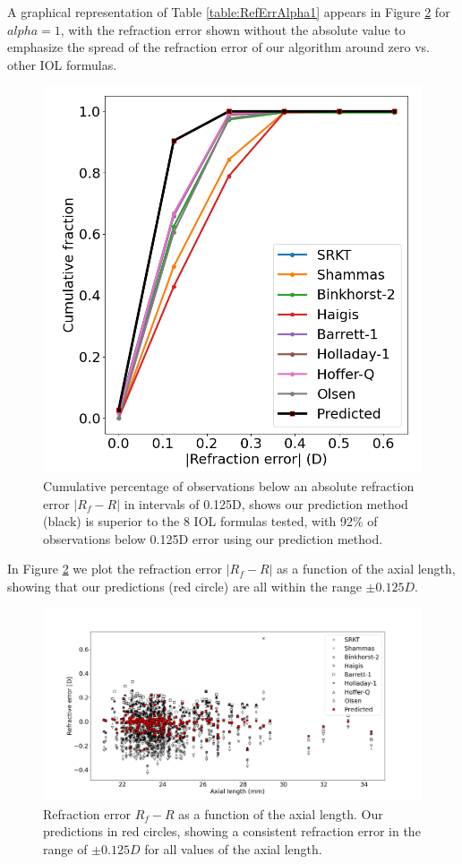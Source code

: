 \documentclass[article,twocolumn,preprint,10pt]{paper}%
\renewcommand{\(}{\left(}
\renewcommand{\)}{\right)}
\renewcommand{\[}{\left[}
\renewcommand{\]}{\right]}
\newcommand{\1}{\mbox{\boldmath$1$}}
\begin{document}
A graphical representation of Table \ref{table:RefErrAlpha1} appears in Figure \ref{fig:RefErrVsAxialLengthAlpha1} for $alpha=1$, with the refraction error shown without the absolute value to emphasize the spread of the refraction error of our algorithm around zero vs. other IOL formulas. 
\begin{figure}
	\centering
	\includegraphics[width=1\linewidth]{cumulativeRefErrAlpha1}
	\caption{Cumulative percentage of observations below an absolute refraction error $|R_f-R|$ in intervals of 0.125D, shows our prediction method (black) is superior to the 8 IOL formulas tested, with 92\% of observations below 0.125D error using our prediction method.}
	\label{fig:cumulativereferralpha1}
\end{figure}


In Figure \ref{fig:RefErrVsAxialLengthAlpha1} we plot the refraction error $|R_f-R|$ as a function of the axial length, showing that our predictions (red circle) are all within the range $\pm0.125D$.
\begin{figure}
	\centering
	\includegraphics[width=1\linewidth]{RefErrVsAxialLength_alpha1}
	\caption{Refraction error $R_f-R$ as a function of the axial length. Our predictions in red circles, showing a consistent refraction error in the range of $\pm0.125D$ for all values of the axial length.}
	\label{fig:RefErrVsAxialLengthAlpha1}
\end{figure}
\end{document}
